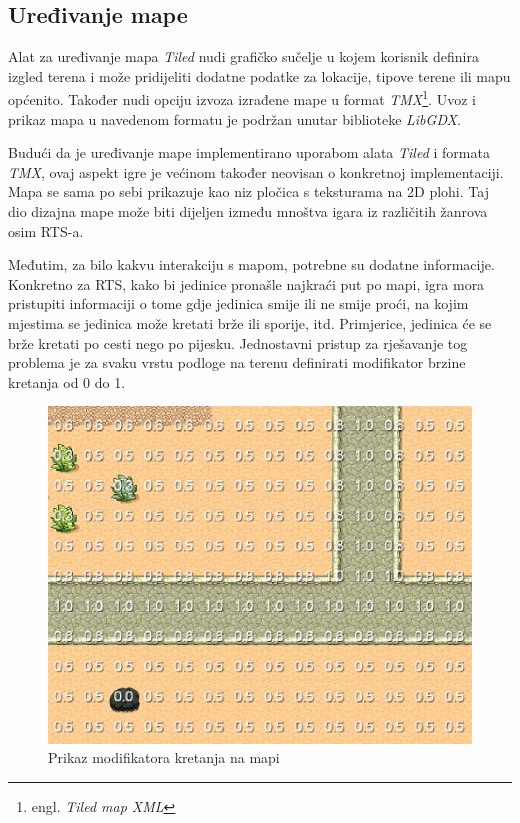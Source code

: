 \documentclass[times, utf8, zavrsni, numeric]{fer}
\begin{document}
\subsection{Uređivanje mape}

\par Alat za uređivanje mapa \textit{Tiled} nudi grafičko sučelje u kojem korisnik definira izgled terena i može pridijeliti dodatne podatke za lokacije, tipove terene ili mapu općenito.
Također nudi opciju izvoza izrađene mape u format \textit{TMX}\footnote{engl. \textit{Tiled map XML}}.
Uvoz i prikaz mapa u navedenom formatu je podržan unutar biblioteke \textit{LibGDX}.

\par Budući da je uređivanje mape implementirano uporabom alata \textit{Tiled} i formata \textit{TMX}, ovaj aspekt igre je većinom također neovisan o konkretnoj implementaciji.
Mapa se sama po sebi prikazuje kao niz pločica s teksturama na 2D plohi.
Taj dio dizajna mape može biti dijeljen između mnoštva igara iz različitih žanrova osim RTS-a.

\par Međutim, za bilo kakvu interakciju s mapom, potrebne su dodatne informacije.
Konkretno za RTS, kako bi jedinice pronašle najkraći put po mapi, igra mora pristupiti informaciji o tome gdje jedinica smije ili ne smije proći, na kojim mjestima se jedinica može kretati brže ili sporije, itd.
Primjerice, jedinica će se brže kretati po cesti nego po pijesku.
Jednostavni pristup za rješavanje tog problema je za svaku vrstu podloge na  terenu definirati modifikator brzine kretanja od 0 do 1.

\begin{figure}[h]
	\centering
	\includegraphics[width=0.6\linewidth]{images/tileModifiers.png}
	\caption{Prikaz modifikatora kretanja na mapi}
	\label{fig:tileModifiers}
\end{figure}
\end{document}
